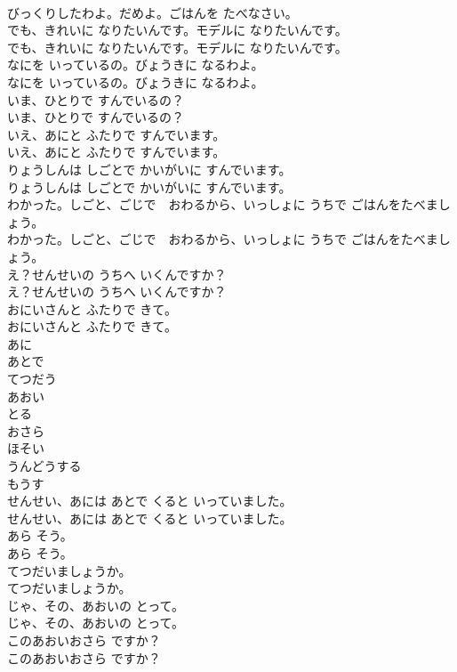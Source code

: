\documentclass[8pt]{extreport}
\begin{document}
\begin{CJK}{UTF8}{min}
\\	びっくりしたわよ。だめよ。ごはんを たべなさい。
\\	でも、きれいに なりたいんです。モデルに なりたいんです。
\\	でも、きれいに なりたいんです。モデルに なりたいんです。
\\	なにを いっているの。びょうきに なるわよ。
\\	なにを いっているの。びょうきに なるわよ。
\\	いま、ひとりで すんでいるの？
\\	いま、ひとりで すんでいるの？
\\	いえ、あにと ふたりで すんでいます。
\\	いえ、あにと ふたりで すんでいます。
\\	りょうしんは しごとで かいがいに すんでいます。
\\	りょうしんは しごとで かいがいに すんでいます。
\\	わかった。しごと、ごじで　おわるから、いっしょに うちで ごはんをたべましょう。
\\	わかった。しごと、ごじで　おわるから、いっしょに うちで ごはんをたべましょう。
\\	え？せんせいの うちへ いくんですか？
\\	え？せんせいの うちへ いくんですか？
\\	おにいさんと ふたりで きて。
\\	おにいさんと ふたりで きて。
\\	あに
\\	あとで
\\	てつだう
\\	あおい
\\	とる
\\	おさら
\\	ほそい
\\	うんどうする
\\	もうす
\\	せんせい、あには あとで くると いっていました。
\\	せんせい、あには あとで くると いっていました。
\\	あら そう。
\\	あら そう。
\\	てつだいましょうか。
\\	てつだいましょうか。
\\	じゃ、その、あおいの とって。
\\	じゃ、その、あおいの とって。
\\	このあおいおさら ですか？
\\	このあおいおさら ですか？

\end{CJK}
\end{document}

